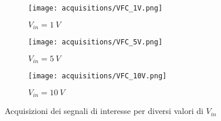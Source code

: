 \begin{figure}[H]
    \centering

    \begin{subfigure}{.5\textwidth}
        \centering
        \texttt{[image: acquisitions/VFC\_1V.png]}
        \caption{$V_{in}=1\ V$}
        \label{acq_vfc110_1v}
    \end{subfigure}%
    \begin{subfigure}{.5\textwidth}
        \centering
        \texttt{[image: acquisitions/VFC\_5V.png]}
        \caption{$V_{in}=5\ V$}
        \label{acq_vfc110_5v}
    \end{subfigure}
    \begin{subfigure}{.5\textwidth}
        \centering
        \texttt{[image: acquisitions/VFC\_10V.png]}
        \caption{$V_{in}=10\ V$}
        \label{acq_vfc110_10v}
    \end{subfigure}

    \caption{Acquisizioni dei segnali di interesse per diversi valori di $V_{in}$}
    \label{acq_vfc110}
\end{figure}


